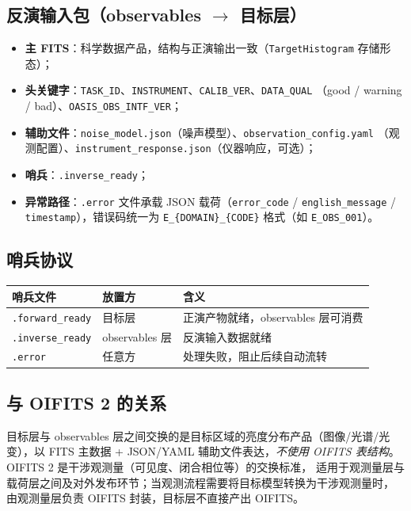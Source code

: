 \subsection{反演输入包（observables $\rightarrow$ 目标层）}

\begin{itemize}
  \item \textbf{主 FITS}：科学数据产品，结构与正演输出一致（\texttt{TargetHistogram} 存储形态）；
  \item \textbf{头关键字}：\texttt{TASK\_ID}、\texttt{INSTRUMENT}、\texttt{CALIB\_VER}、\texttt{DATA\_QUAL}
        （good / warning / bad）、\texttt{OASIS\_OBS\_INTF\_VER}；
  \item \textbf{辅助文件}：\texttt{noise\_model.json}（噪声模型）、\texttt{observation\_config.yaml}
        （观测配置）、\texttt{instrument\_response.json}（仪器响应，可选）；
  \item \textbf{哨兵}：\texttt{.inverse\_ready}；
  \item \textbf{异常路径}：\texttt{.error} 文件承载 JSON 载荷（\texttt{error\_code} / \texttt{english\_message} /
        \texttt{timestamp}），错误码统一为 \texttt{E\_\{DOMAIN\}\_\{CODE\}} 格式（如 \texttt{E\_OBS\_001}）。
\end{itemize}

\subsection{哨兵协议}

\begin{center}
\begin{tabular}{lll}
\toprule
哨兵文件 & 放置方 & 含义 \\
\midrule
\texttt{.forward\_ready} & 目标层 & 正演产物就绪，observables 层可消费 \\
\texttt{.inverse\_ready} & observables 层 & 反演输入数据就绪 \\
\texttt{.error} & 任意方 & 处理失败，阻止后续自动流转 \\
\bottomrule
\end{tabular}
\end{center}

\subsection{与 OIFITS 2 的关系}

目标层与 observables 层之间交换的是目标区域的亮度分布产品（图像/光谱/光变），以 FITS 主数据 +
JSON/YAML 辅助文件表达，\emph{不使用 OIFITS 表结构}。OIFITS 2 是干涉观测量（可见度、闭合相位等）的交换标准，
适用于观测量层与载荷层之间及对外发布环节；当观测流程需要将目标模型转换为干涉观测量时，
由观测量层负责 OIFITS 封装，目标层不直接产出 OIFITS。

